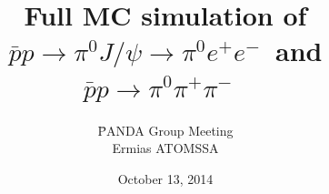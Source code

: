 \documentclass{beamer}
\begin{document}
\newcommand{\pnd}{\=PANDA }
\newcommand{\streama}{{\color{blue} Stream A~}}
\newcommand{\streamb}{{\color{red} Stream B~}}
\newcommand{\dm}{\mathrm{d}m}
\newcommand{\dpt}{\mathrm{d}p_T}
\newcommand{\pt}{p_T}
\newcommand{\tab}{\hspace{0.25cm}}

\newcommand{\pip}{{\normalsize$\pi^+$~}}
\newcommand{\pim}{{\normalsize$\pi^-$~}}
\newcommand{\pipm}{{\normalsize$\pi^{+}\pi^{-}$~}}
\newcommand{\epm}{{\normalsize$e^+e^-$}}
\newcommand{\piz}{{\normalsize$\pi^0$~}}
\newcommand{\jpsi}{{\normalsize$J/\psi$~}}
\newcommand{\jpsipbarp}{{\normalsize$J/\psi\rightarrow p\bar{p}$~}}

\newcommand{\pipT}{{\LARGE$\pi^+$~}}
\newcommand{\pimT}{{\LARGE$\pi^-$~}}
\newcommand{\pipmT}{{\LARGE$\pi^{+}\pi^{-}$~}}
\newcommand{\epmT}{{\LARGE$e^+e^-$}}
\newcommand{\pizT}{{\LARGE$\pi^0$~}}
\newcommand{\jpsiT}{{\LARGE$J/\psi$~}}
\newcommand{\jpsipbarpT}{{\LARGE$J/\psi\rightarrow p\bar{p}$~}}


\newcommand{\pintda}{$\pi$-N~TDA~}
\newcommand{\pintdas}{$\pi$-N~TDAs~}
\newcommand{\piantda}{$\pi$-$\bar{N}$~TDA~}
\newcommand{\piantdas}{$\pi$-$\bar{N}$~TDAs~}

\newcommand{\pizjpsi}{{\normalsize$\pi^0J/\psi$~}}
\newcommand{\pizpipm}{{\normalsize$\pi^0$\pipm}}
\newcommand{\pizjpsiT}{{\LARGE$\pi^0J/\psi$~}}
\newcommand{\pizpipmT}{{\LARGE$\pi^0$\pipmT}}

\newcommand{\sigrxn}{{\normalsize$\bar{p}p\rightarrow\pi^0J/\psi\rightarrow\pi^0e^+e^-$~}}
\newcommand{\sigrxnepem}{{\normalsize$\bar{p}p\rightarrow\pi^0\gamma^*\rightarrow\pi^0e^+e^-$~}}
\newcommand{\bgrxn}{{\normalsize$\bar{p}p\rightarrow\pi^0\pi^{+}\pi^{-}$~}}
\newcommand{\sigrxnT}{{\LARGE$\bar{p}p\rightarrow\pi^0J/\psi\rightarrow\pi^0e^+e^-$~}}
\newcommand{\sigrxnepemT}{{\LARGE$\bar{p}p\rightarrow\pi^0\gamma^*\rightarrow\pi^0e^+e^-$~}}
\newcommand{\bgrxnT}{{\LARGE$\bar{p}p\rightarrow\pi^0\pi^{+}\pi^{-}$~}}


\newcommand{\bgcut}{$-0.5<t[$GeV$^2]<0.6$, $2.96<M_{inv}[$GeV/c$^2] < 3.22$~}
\newcommand{\tcut}{$-0.5<t[$GeV$^2]<0.6$~}
\newcommand{\ucut}{$-0.5<u[$GeV$^2]<0.6$~}


\title[\pnd Group Meeting, TDA]{Full MC simulation of \sigrxn and \bgrxn}

\author[Ermias ATOMSSA]{\pnd Group Meeting\\ \vskip 0.5cm Ermias ATOMSSA}

\date[October 13, 2014]{October 13, 2014}
\end{document}
